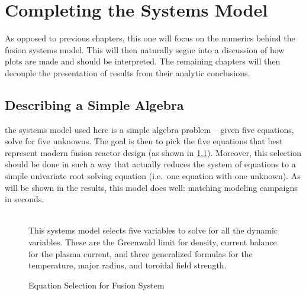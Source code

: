 %
%
%
%
%
%
%
%


\chapter{Completing the Systems Model}

\label{chapter:complete}

As opposed to previous chapters, this one will focus on the numerics behind the fusion systems model.   This will then naturally segue into a discussion of how plots are made and should be interpreted. The remaining chapters will then decouple the presentation of results from their analytic conclusions.

\section{Describing a Simple Algebra}

 the systems model used here is a simple algebra problem -- given five equations, solve for five unknowns. The goal is then to pick the five equations that best represent modern fusion reactor design (as shown in \cref{fig:equation_breakdown}). Moreover, this selection should be done in such a way that actually reduces the system of equations to a simple univariate root solving equation (i.e.\ one equation with one unknown). As will be shown in the results, this model does  well: matching  modeling campaigns in seconds.

\begin{figure}
	\centering
	\begin{adjustbox}{width=0.75\textwidth}
		
	\end{adjustbox}
	\caption{Equation Selection for Fusion System} ~\\
	\small This systems model selects five variables to solve for all the dynamic variables. These are the Greenwald limit for density, current balance for the plasma current, and three generalized formulas for the temperature, major radius, and toroidal field strength.
	\label{fig:equation_breakdown}
\end{figure}

